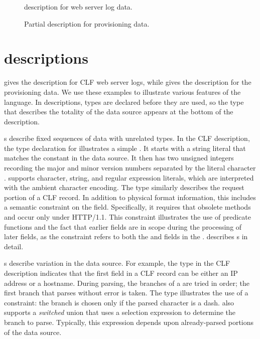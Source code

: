 \begin{figure}

\caption{\pads{} description for web server log data.}
\label{figure:wsl}
\end{figure}

\begin{figure}

\caption{Partial \pads{} description for \dibbler{} provisioning data.}
\label{figure:dibbler}
\end{figure}



\section{\padsl{} descriptions}
\label{sec:example:padsl-description}
 gives the \pads{} description for CLF web server
logs,  while  gives the description for the
\dibbler{} provisioning data.  We use these examples to illustrate
various features of the \pads{} language.  In \pads{} descriptions,
types are declared before they are used, so the type that describes
the totality of the data source appears at the bottom of the
description.

s describe fixed sequences of data with unrelated types.
In the CLF description, the type declaration for 
illustrates a simple . It starts with a string literal
that matches the constant  in the data source.  It then has
two unsigned integers recording the major and minor version numbers
separated by the literal character .  \pads{} supports
character, string, and regular expression literals, which are
interpreted with the ambient character encoding. The type
 similarly describes the request portion of a CLF
record.  In addition to physical format information, this 
includes a semantic constraint on the  field.
Specifically, it requires that obsolete methods  and
 occur only under HTTP/1.1.  This constraint illustrates
the use of predicate functions and the fact that earlier fields are in
scope during the processing of later fields, as the constraint refers
to both the  and  fields in the .
 describes s in detail.

s describe variation in the data source.  For example, the
 type in the CLF description indicates that the first
field in a CLF record can be either an IP address or a hostname.
During parsing, the branches of a  are tried in order; the
first branch that parses without error is taken.  The 
type illustrates the use of a constraint: the branch 
is chosen only if the parsed character is a dash.  \pads{} also
supports a \textit{switched} union that uses a selection expression to
determine the branch to parse.  Typically, this expression depends
upon already-parsed portions of the data source.

